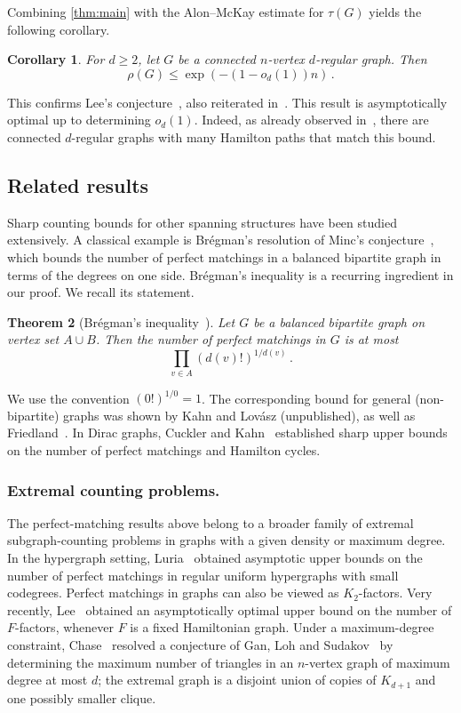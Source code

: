 \documentclass[10pt,a4paper]{amsart}
\numberwithin{equation}{section}
\newtheorem{theorem}{Theorem}[section]
\newtheorem{corollary}[theorem]{Corollary}
\theoremstyle{definition}
\theoremstyle{remark}
\begin{document}
Combining \cref{thm:main} with the Alon--McKay estimate for $\tau(G)$ yields the following corollary.
\begin{corollary}\label{cor:anticoncentration}
    For $d\geq 2$, let $G$ be a connected $n$-vertex $d$-regular graph. Then
    \[
        \rho(G)\leq \exp(-(1-o_d(1))n)\,.
    \]
\end{corollary}
This confirms Lee's conjecture~\cite[Conjecture 4.3]{Lee}, also reiterated in~\cite{Wang}.
This result is asymptotically optimal up to determining $o_d(1)$. Indeed, as already observed in~\cite{Lee}, there are connected $d$-regular graphs with many Hamilton paths that match this bound.

\subsection{Related results}
Sharp counting bounds for other spanning structures have been studied extensively. A classical example is Br\'egman's resolution of Minc's conjecture~\cite{Bregman1973}, which bounds the number of perfect matchings in a balanced bipartite graph in terms of the degrees on one side. Br\'egman's inequality is a recurring ingredient in our proof. We recall its statement.
\begin{theorem}[Br\'egman's inequality~\cite{Bregman1973}]\label{thm:bregman}
    Let $G$ be a balanced bipartite graph on vertex set $A\cup B$. Then the number of perfect matchings in $G$ is at most 
    \[
        \prod_{v\in A} (d(v)!)^{1/d(v)}\,.
    \]
\end{theorem}
We use the convention $(0!)^{1/0} = 1$.
The corresponding bound for general (non-bipartite) graphs was shown by Kahn and Lov\'asz (unpublished), as well as Friedland~\cite{Alon-Friedland,friedland2008upper,cutler2011entropy}. 
In Dirac graphs, Cuckler and Kahn~\cite{Cuckler-Kahn-Entropy} established sharp upper bounds on the number of perfect matchings and Hamilton cycles. 


\subsubsection{Extremal counting problems.}
The perfect-matching results above belong to a broader family of extremal subgraph-counting problems in graphs with a given density or maximum degree. In the hypergraph setting, Luria~\cite{Luria-n-queens} obtained asymptotic upper bounds on the number of perfect matchings in regular uniform hypergraphs with small codegrees.
Perfect matchings in graphs can also be viewed as $K_2$-factors. Very recently, Lee~\cite{LeeFactors} obtained an asymptotically optimal upper bound on the number of $F$-factors, whenever $F$ is a fixed Hamiltonian graph.
Under a maximum-degree constraint, Chase~\cite{Chase2020} resolved a conjecture of Gan, Loh and Sudakov~\cite{GanLohSudakov2015} by determining the maximum number of triangles in an $n$-vertex graph of maximum degree at most $d$; the extremal graph is a disjoint union of copies of $K_{d+1}$ and one possibly smaller clique.
\end{document}
